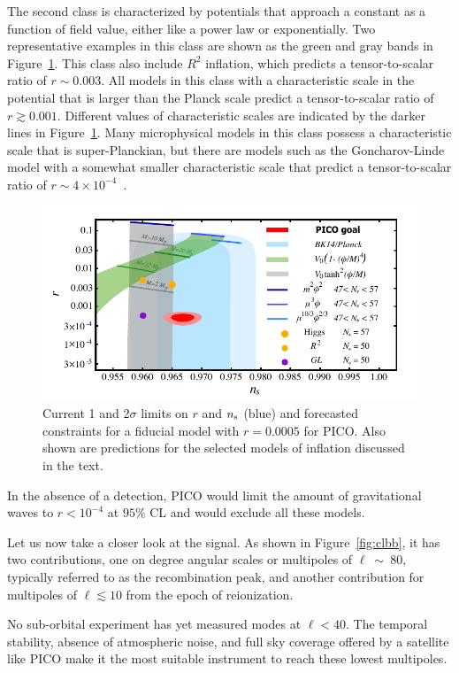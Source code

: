 \documentclass[PICOReport.tex]{subfiles}
\begin{document}
The second class is characterized by potentials that approach a constant as a function of field value, either like a power law or exponentially. Two representative examples in this class are shown as the green and gray bands in Figure~\ref{fig:nsr}. This class also include $R^2$ inflation, which predicts a tensor-to-scalar ratio of $r\sim 0.003$. All models in this class with a characteristic scale in the potential that is larger than the Planck scale predict a tensor-to-scalar ratio of $r\gtrsim 0.001$. Different values of characteristic scales are indicated by the darker lines in Figure~\ref{fig:nsr}. Many microphysical models in this class possess a characteristic scale that is super-Planckian, but there are models such as the Goncharov-Linde model with a somewhat smaller characteristic scale that predict a tensor-to-scalar ratio of $r\sim 4\times 10^{-4}$~\cite{Goncharov:1983mw}. 
\begin{figure}[!thb]
\parbox{4.5in}{\centerline{
\includegraphics[width=4.5in]{images/nsrlabeledrp0005_PICOv4p1.pdf}}}
\parbox{1.8in}{
\caption{Current 1 and 2$\sigma$ limits on $r$ and $n_{\rm s}$ (blue) and forecasted constraints for a fiducial model with $r = 0.0005$ for PICO. Also shown are predictions for the selected models of inflation discussed in the text.
}
\label{fig:nsr}}
\end{figure}

In the absence of a detection, PICO would limit the amount of gravitational waves to $r<10^{-4}$ at $95\%$ CL and would exclude all these models. 

Let us now take a closer look at the signal. As shown in Figure~\ref{fig:clbb}, it has two contributions, one on degree angular scales or multipoles of $\ell~\sim~80$, typically referred to as the recombination peak, and another contribution for multipoles of $\ell\lesssim 10$ from the epoch of reionization. 

No sub-orbital experiment has yet measured modes at $\ell<40$. The temporal stability, absence of atmospheric noise, and full sky coverage offered by a satellite like PICO make it the most suitable instrument to reach these lowest multipoles.  
\end{document}
